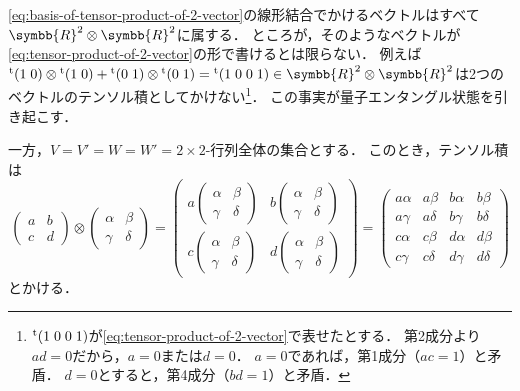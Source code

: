 \documentclass[../sotsu.tex]{subfiles}
\begin{document}
\cref{eq:basis-of-tensor-product-of-2-vector}の線形結合でかけるベクトルはすべて$\symbb{R}^2 \otimes \symbb{R}^2$に属する．
ところが，そのようなベクトルが\cref{eq:tensor-product-of-2-vector}の形で書けるとは限らない．
例えば\(
    \tp{(1 \; 0)} \otimes \tp{(1 \; 0)} + \tp{(0 \; 1)} \otimes \tp{(0 \; 1)}
    =
    \tp{(1 \; 0 \; 0 \; 1)} \in \symbb{R}^2 \otimes \symbb{R}^2
\)は2つのベクトルのテンソル積としてかけない\footnote{
    ${}^{\mathrm{t}}(1 \; 0 \; 0 \; 1)$が\cref{eq:tensor-product-of-2-vector}で表せたとする．
    第2成分より$ad = 0$だから，$a=0$または$d=0$．
    $a=0$であれば，第1成分（$ac = 1$）と矛盾．
    $d=0$とすると，第4成分（$bd = 1$）と矛盾．
}．
この事実が量子エンタングル状態を引き起こす．

一方，\( V = V' = W = W' = \text{$2 \times 2$-行列全体の集合} \)とする．
このとき，テンソル積は
\begin{equation}
    \label{eq:tensor-product-of-2-matrix}
    \begin{pmatrix}
        a  & b  \\ c  & d 
    \end{pmatrix}
    \otimes 
    \begin{pmatrix}
        \alpha & \beta \\ \gamma & \delta
    \end{pmatrix}
    =
    \begin{pmatrix}
        a
        \begin{pmatrix}
            \alpha & \beta \\ \gamma & \delta
        \end{pmatrix}
        &
        b
        \begin{pmatrix}
            \alpha & \beta \\ \gamma & \delta
        \end{pmatrix}
        \\
        c
        \begin{pmatrix}
            \alpha & \beta \\ \gamma & \delta
        \end{pmatrix}
        &
        d
        \begin{pmatrix}
            \alpha & \beta \\ \gamma & \delta
        \end{pmatrix}
    \end{pmatrix}
    =
    \begin{pmatrix}
        a \alpha  &  a \beta   &  b \alpha  &  b \beta   \\
        a \gamma  &  a \delta  &  b \gamma  &  b \delta  \\
        c \alpha  &  c \beta   &  d \alpha  &  d \beta   \\
        c \gamma  &  c \delta  &  d \gamma  &  d \delta  
    \end{pmatrix}
\end{equation}
とかける．
\end{document}
